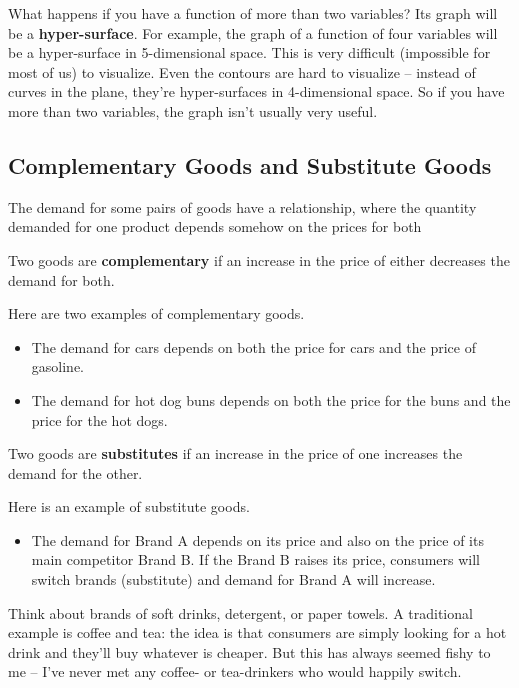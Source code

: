 What happens if you have a function of more than two variables? Its graph will be a {\bf hyper-surface}. For example, the graph of a function of four variables will be a hyper-surface in 5-dimensional space. This is very difficult (impossible for most of us) to visualize. Even the contours are hard to visualize -- instead of curves in the plane, they're hyper-surfaces in 4-dimensional space. So if you have more than two variables, the graph isn't usually very useful.

\subsection{Complementary Goods and Substitute Goods}
The demand for some pairs of goods have a relationship, where the quantity demanded for one product depends somehow on the prices for both
\begin{definition}
Two goods are {\bf complementary} if an increase in the price of either decreases the demand for both.
\end{definition}

\begin{example} Here are two examples of complementary goods.
\begin{itemize}
  \item The demand for cars depends on both the price for cars and the price of gasoline.
  \item The demand for hot dog buns depends on both the price for the buns and the price for the hot dogs.
\end{itemize}
\end{example}

\begin{definition}
Two goods are {\bf substitutes} if an increase in the price of one increases the demand for the other.
\end{definition}
\begin{example} Here is an example of substitute goods.
\begin{itemize}
  \item The demand for Brand A depends on its price and also on the price of its main competitor Brand B. If the Brand B raises its price, consumers will switch brands (substitute) and demand for Brand A will increase.
\end{itemize}
\end{example}
Think about brands of soft drinks, detergent, or paper towels. A traditional example is coffee and tea: the idea is that consumers are simply looking for a hot drink and they'll buy whatever is cheaper. But this has always seemed fishy to me -- I've never met any coffee- or tea-drinkers who would happily switch.

